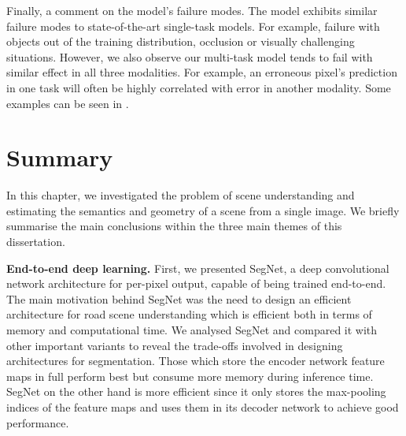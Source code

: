 Finally, a comment on the model's failure modes. The model exhibits similar failure modes to state-of-the-art single-task models. For example, failure with objects out of the training distribution, occlusion or visually challenging situations. However, we also observe our multi-task model tends to fail with similar effect in all three modalities. For example, an erroneous pixel's prediction in one task will often be highly correlated with error in another modality. Some examples can be seen in .





















































\section{Summary}

In this chapter, we investigated the problem of scene understanding and estimating the semantics and geometry of a scene from a single image. We briefly summarise the main conclusions within the three main themes of this dissertation.

\textbf{End-to-end deep learning.}
First, we presented SegNet, a deep convolutional network architecture for per-pixel output, capable of being trained end-to-end. The main motivation behind SegNet was the need to design an efficient architecture for road scene understanding which is efficient both in terms of memory and computational time. We analysed SegNet and compared it with other important variants to reveal the trade-offs involved in designing architectures for segmentation. Those which store the encoder network feature maps in full perform best but consume more memory during inference time. SegNet on the other hand is more efficient since it only stores the max-pooling indices of the feature maps and uses them in its decoder network to achieve good performance.

